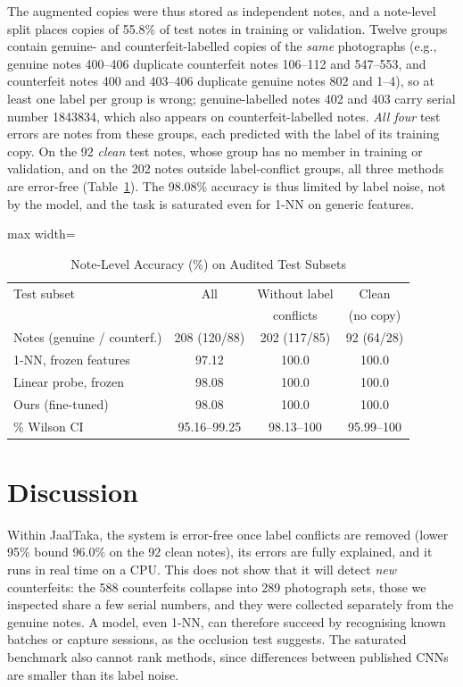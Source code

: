 \documentclass[journal]{IEEEtran}
\begin{document}
The augmented copies were thus stored as independent notes, and a note-level split
places copies of 55.8\% of test notes in training or validation. Twelve groups contain
genuine- and counterfeit-labelled copies of the \emph{same} photographs (e.g., genuine
notes 400--406 duplicate counterfeit notes 106--112 and 547--553, and counterfeit notes
400 and 403--406 duplicate genuine notes 802 and 1--4), so at least one label
per group is wrong; genuine-labelled notes 402 and 403 carry serial number 1843834,
which also appears on counterfeit-labelled notes. \emph{All four} test errors are notes
from these groups, each predicted with the label of its training copy. On the 92
\emph{clean} test notes, whose group has no member in training or validation, and on the
202 notes outside label-conflict groups, all three methods are error-free
(Table~\ref{tab:clean}). The 98.08\% accuracy is thus limited by label noise, not by the
model, and the task is saturated even for 1-NN on generic features.

\begin{table}[!t]
\caption{Note-Level Accuracy (\%) on Audited Test Subsets}
\label{tab:clean}
\centering
\footnotesize
\setlength{\tabcolsep}{4pt}
\begin{adjustbox}{max width=\columnwidth}
\begin{tabular}{@{}lccc@{}}
\toprule
Test subset & All & Without label & Clean \\
& & conflicts & (no copy) \\
\midrule
Notes (genuine / counterf.) & 208 (120/88) & 202 (117/85) & 92 (64/28) \\
\midrule
1-NN, frozen features & 97.12 & 100.0 & 100.0 \\
Linear probe, frozen & 98.08 & 100.0 & 100.0 \\
Ours (fine-tuned) & 98.08 & 100.0 & 100.0 \\
\quad 95\% Wilson CI & 95.16--99.25 & 98.13--100 & 95.99--100 \\
\bottomrule
\end{tabular}
\end{adjustbox}
\end{table}

\section{Discussion}
\label{sec:discussion}

Within JaalTaka, the system is error-free once label conflicts are removed (lower 95\%
bound 96.0\% on the 92 clean notes), its errors are fully explained, and it runs in real
time on a CPU. This does not show that it will detect \emph{new} counterfeits: the 588
counterfeits collapse into 289 photograph sets, those we inspected share a few serial
numbers, and they were collected separately from the genuine notes. A model, even 1-NN,
can therefore succeed by recognising known batches or capture sessions, as the occlusion
test suggests. The saturated benchmark also cannot rank methods, since differences
between published CNNs are smaller than its label noise.
\end{document}
